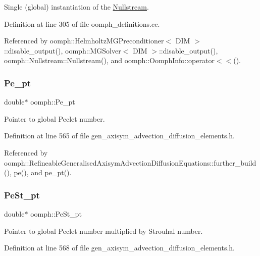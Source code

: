 Single (global) instantiation of the \hyperlink{classoomph_1_1Nullstream}{Nullstream}. 



Definition at line 305 of file oomph\+\_\+definitions.\+cc.



Referenced by oomph\+::\+Helmholtz\+M\+G\+Preconditioner$<$ D\+I\+M $>$\+::disable\+\_\+output(), oomph\+::\+M\+G\+Solver$<$ D\+I\+M $>$\+::disable\+\_\+output(), oomph\+::\+Nullstream\+::\+Nullstream(), and oomph\+::\+Oomph\+Info\+::operator$<$$<$().

\mbox{\label{namespaceoomph_ae8c74390a52fa2e57b6ef898649fdfff}} 
\subsubsection{\texorpdfstring{Pe\+\_\+pt}{Pe\_pt}}
{\footnotesize\ttfamily double$\ast$ oomph\+::\+Pe\+\_\+pt\hspace{0.3cm}{\ttfamily [protected]}}



Pointer to global Peclet number. 



Definition at line 565 of file gen\+\_\+axisym\+\_\+advection\+\_\+diffusion\+\_\+elements.\+h.



Referenced by oomph\+::\+Refineable\+Generalised\+Axisym\+Advection\+Diffusion\+Equations\+::further\+\_\+build(), pe(), and pe\+\_\+pt().

\mbox{\label{namespaceoomph_a54db0b0b7bccb80aa5110f4d86758dd5}} 
\subsubsection{\texorpdfstring{Pe\+St\+\_\+pt}{PeSt\_pt}}
{\footnotesize\ttfamily double$\ast$ oomph\+::\+Pe\+St\+\_\+pt\hspace{0.3cm}{\ttfamily [protected]}}



Pointer to global Peclet number multiplied by Strouhal number. 



Definition at line 568 of file gen\+\_\+axisym\+\_\+advection\+\_\+diffusion\+\_\+elements.\+h.



